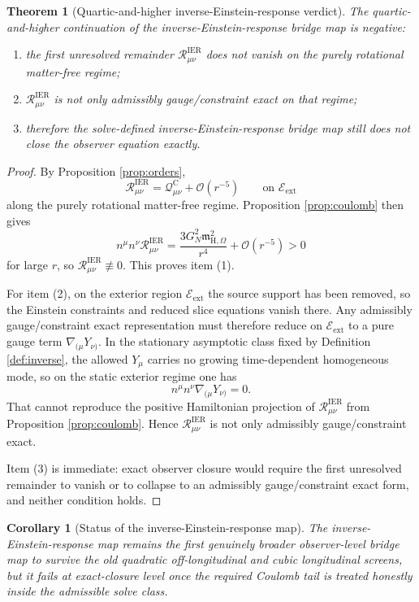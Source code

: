 \documentclass[11pt]{article}
\newcommand{\HamChargeOmega}{\mathfrak m_{\mathrm H,\Omega}}
\newcommand{\Exterior}{\mathcal E_{\mathrm{ext}}}
\newtheorem{corollary}{Corollary}
\newtheorem{theorem}{Theorem}
\begin{document}
\begin{theorem}[Quartic-and-higher inverse-Einstein-response verdict]
\label{thm:verdict}
The quartic-and-higher continuation of the inverse-Einstein-response bridge map is negative:
\begin{enumerate}
    \item the first unresolved remainder \(\mathcal R_{\mu\nu}^{\mathrm{IER}}\) does \emph{not} vanish on the purely rotational matter-free regime;
    \item \(\mathcal R_{\mu\nu}^{\mathrm{IER}}\) is not only admissibly gauge/constraint exact on that regime;
    \item therefore the solve-defined inverse-Einstein-response bridge map still does \emph{not} close the observer equation exactly.
\end{enumerate}
\end{theorem}

\begin{proof}
By Proposition \ref{prop:orders},
\[
\mathcal R_{\mu\nu}^{\mathrm{IER}}
=
\mathcal Q_{\mu\nu}^{\mathrm C}
+\mathcal O(r^{-5})
\qquad
\text{on }\Exterior
\]
along the purely rotational matter-free regime. Proposition \ref{prop:coulomb} then gives
\[
n^\mu n^\nu \mathcal R_{\mu\nu}^{\mathrm{IER}}
=
\frac{3G_N^2\HamChargeOmega^2}{r^4}
+\mathcal O(r^{-5})
>0
\]
for large \(r\), so \(\mathcal R_{\mu\nu}^{\mathrm{IER}}\not\equiv0\). This proves item (1).

For item (2), on the exterior region \(\Exterior\) the source support has been removed, so the Einstein constraints and reduced slice equations vanish there. Any admissibly gauge/constraint exact representation must therefore reduce on \(\Exterior\) to a pure gauge term \(\nabla_{(\mu}Y_{\nu)}\). In the stationary asymptotic class fixed by Definition \ref{def:inverse}, the allowed \(Y_\mu\) carries no growing time-dependent homogeneous mode, so on the static exterior regime one has
\[
n^\mu n^\nu \nabla_{(\mu}Y_{\nu)}=0.
\]
That cannot reproduce the positive Hamiltonian projection of \(\mathcal R_{\mu\nu}^{\mathrm{IER}}\) from Proposition \ref{prop:coulomb}. Hence \(\mathcal R_{\mu\nu}^{\mathrm{IER}}\) is not only admissibly gauge/constraint exact.

Item (3) is immediate: exact observer closure would require the first unresolved remainder to vanish or to collapse to an admissibly gauge/constraint exact form, and neither condition holds.
\end{proof}

\begin{corollary}[Status of the inverse-Einstein-response map]
\label{cor:status}
The inverse-Einstein-response map remains the first genuinely broader observer-level bridge map to survive the old quadratic off-longitudinal and cubic longitudinal screens, but it fails at exact-closure level once the required Coulomb tail is treated honestly inside the admissible solve class.
\end{corollary}
\end{document}
